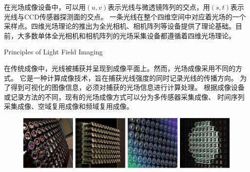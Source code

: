 

在光场成像设备中，可以用$(u, v)$表示光线与微透镜阵列的交点，用$(s, t)$表示光线与CCD传感器探测面的交点。
一条光线在整个四维空间中对应着光场的一个采样点。四维光场理论的推出为全光相机、相机阵列等设备提供了理论基础。目前，大多数单体全光相机和相机阵列的光场采集设备都遵循着四维光场理论。
%
%






{Principles of Light Field Imaging}

在传统成像中，光线被捕获并呈现到成像平面上。然而，光场成像采用不同的方式。
它是一种计算成像技术，旨在捕获光线强度的同时记录光线的传播方向。
为了得到可视化的图像信息，必须对捕获的光场信息进行计算处理。
根据成像设备或记录方法的不同，现有的光场成像方式可以分为多传感器采集成像、
时间序列采集成像、空域复用成像和频域复用成像。









\begin{figure}[b]
	\centering
	\includegraphics[width=1\linewidth]{figures/chapter2/camera_array}
	\label{chapter2_fig2:camera_array}
\end{figure}




